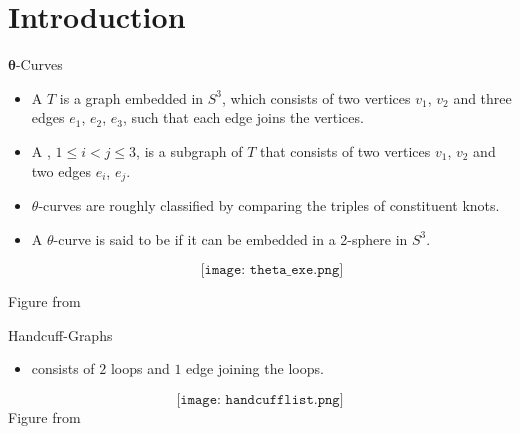 \section{Introduction}
\begin{frame}{$\mathbf{\theta}$-Curves}
	\begin{itemize}
		\item A  $T$ is a graph embedded in $S^3$,
		which consists of two vertices $v_1$, $v_2$
		and three edges $e_1$, $e_2$, $e_3$,
		such that each edge joins the vertices.
		\item A , $1 \le i < j \le 3$, is a subgraph of $T$
		that consists of two vertices $v_1$, $v_2$ and two edges $e_i$, $e_j$.
		
		\item $\theta$-curves are roughly classified by comparing the triples of constituent knots.
		
		\item A $\theta$-curve is said to be  if it can be embedded in a 2-sphere in $S^3$.

		$$\texttt{[image: theta\_exe.png]}$$
	\end{itemize}
	
	\seprule
	\hfill\tiny{Figure from \cite{theta_7}}
\end{frame}

\begin{frame}{Handcuff-Graphs}
	\begin{itemize}
		\item {} consists of $2$ loops and $1$ edge joining the loops.
	\end{itemize}

	$$\texttt{[image: handcufflist.png]}$$
	\seprule
	\hfill\tiny{Figure from \cite{handcufflist}}
\end{frame}

